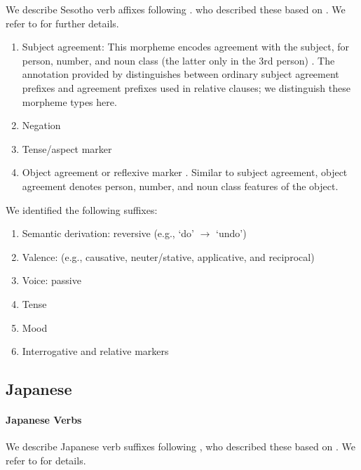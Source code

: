 \documentclass[11pt,letterpaper]{article}
\begin{document}
We describe Sesotho verb affixes following \cite{Hahn2020modeling}.
who described these based on \citep{doke1967textbook, guma1971outline, demuth1992acquisition}.
We refer to \cite{Hahn2020modeling} for further details.

\begin{enumerate}
    \item Subject agreement: This morpheme encodes agreement with the subject, for person, number, and noun class (the latter only in the 3rd person) \cite[]{doke1967textbook}.
            The annotation provided by \cite{demuth1992acquisition} distinguishes between ordinary subject agreement prefixes and agreement prefixes used in relative clauses; we distinguish these morpheme types here.

    \item Negation \citep[]{doke1967textbook}

    \item Tense/aspect marker   \citep[--424]{doke1967textbook}

    \item Object agreement or reflexive marker \citep[]{doke1967textbook}.
    Similar to subject agreement, object agreement denotes person, number, and noun class features of the object.
\end{enumerate}
We identified the following suffixes:

\begin{enumerate}
\item Semantic derivation: reversive (e.g., `do' $\rightarrow$ `undo')
\item Valence: (e.g., causative, neuter/stative, applicative, and reciprocal)
    \item Voice: passive
    \item Tense
    \item Mood
    \item Interrogative and relative markers
\end{enumerate}

\subsection{Japanese}

\paragraph{Japanese Verbs}
We describe Japanese verb suffixes following \citep{Hahn2020modeling}, who described these based on \citep{kaiser2013japanese,hasegawa2014japanese}.
We refer to \citep{Hahn2020modeling} for details.
\end{document}

